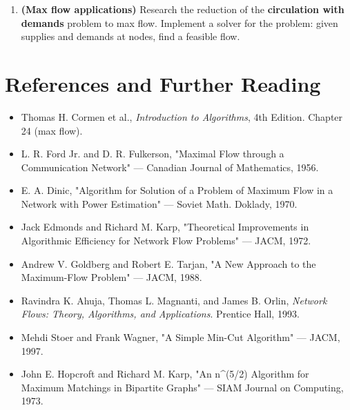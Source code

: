 \begin{enumerate}
\item \textbf{(Max flow applications)} Research the reduction of the \textbf{circulation with demands} problem to max flow. Implement a solver for the problem: given supplies and demands at nodes, find a feasible flow.
\end{enumerate}
\section{References and Further Reading}

\begin{itemize}
\item Thomas H. Cormen et al., \textit{Introduction to Algorithms}, 4th Edition. Chapter 24 (max flow).
\item L. R. Ford Jr. and D. R. Fulkerson, "Maximal Flow through a Communication Network" — Canadian Journal of Mathematics, 1956.
\item E. A. Dinic, "Algorithm for Solution of a Problem of Maximum Flow in a Network with Power Estimation" — Soviet Math. Doklady, 1970.
\item Jack Edmonds and Richard M. Karp, "Theoretical Improvements in Algorithmic Efficiency for Network Flow Problems" — JACM, 1972.
\item Andrew V. Goldberg and Robert E. Tarjan, "A New Approach to the Maximum-Flow Problem" — JACM, 1988.
\item Ravindra K. Ahuja, Thomas L. Magnanti, and James B. Orlin, \textit{Network Flows: Theory, Algorithms, and Applications}. Prentice Hall, 1993.
\item Mehdi Stoer and Frank Wagner, "A Simple Min-Cut Algorithm" — JACM, 1997.
\item John E. Hopcroft and Richard M. Karp, "An n\textasciicircum{}(5/2) Algorithm for Maximum Matchings in Bipartite Graphs" — SIAM Journal on Computing, 1973.
\end{itemize}
